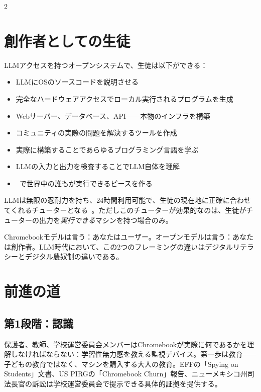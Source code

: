 \documentclass[11pt, a4paper]{article}
\begin{document}
\begin{multicols}{2}
\section{創作者としての生徒}

LLMアクセスを持つオープンシステムで、生徒は以下ができる：

\begin{itemize}
  \item LLMにOSのソースコードを説明させる
  \item 完全なハードウェアアクセスでローカル実行されるプログラムを生成
  \item Webサーバー、データベース、API——本物のインフラを構築
  \item コミュニティの実際の問題を解決するツールを作成
  \item 実際に構築することであらゆるプログラミング言語を学ぶ
  \item LLMの入力と出力を検査することでLLM自体を理解
  \item \ac{}~\citep{scudder2026ac}で世界中の誰もが実行できるピースを作る
\end{itemize}

LLMは無限の忍耐力を持ち、24時間利用可能で、生徒の現在地に正確に合わせてくれるチューターとなる~\citep{khan2024bravenew}。ただしこのチューターが効果的なのは、生徒がチューターの出力を\emph{実行できる}マシンを持つ場合のみ。

Chromebookモデルは言う：あなたはユーザー。オープンモデルは言う：あなたは創作者。LLM時代において、この2つのフレーミングの違いはデジタルリテラシーとデジタル農奴制の違いである。


\section{前進の道}

\subsection{第1段階：認識}

保護者、教師、学校運営委員会メンバーはChromebookが実際に何であるかを理解しなければならない：学習性無力感を教える監視デバイス。第一歩は教育——子どもの教育ではなく、マシンを購入する大人の教育。EFFの「Spying on Students」文書、US PIRGの「Chromebook Churn」報告、ニューメキシコ州司法長官の訴訟は学校運営委員会で提示できる具体的証拠を提供する。


\end{multicols}
\end{document}
